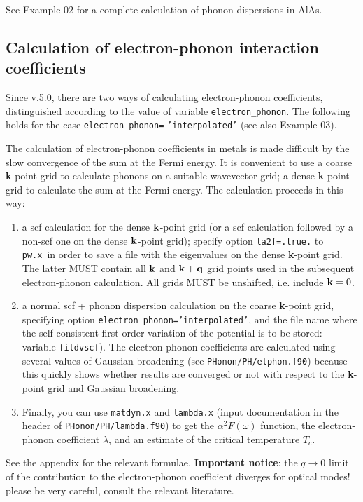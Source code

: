 \documentclass[12pt,a4paper]{article}
\def\pwx{\texttt{pw.x}}
\begin{document}
See Example 02 for a complete calculation of phonon dispersions in AlAs.

\subsection{Calculation of electron-phonon interaction coefficients}

Since v.5.0, there are two ways of calculating electron-phonon
coefficients, distinguished according to the value of variable 
\texttt{electron\_phonon}. The following holds for the case 
\texttt{electron\_phonon=} {\tt'interpolated'} (see also Example 03).

The calculation of electron-phonon coefficients in metals is made difficult 
by the slow convergence of the sum at the Fermi energy. It is convenient to 
use a coarse {\bf k}-point grid to calculate phonons on a suitable 
wavevector grid;
a dense {\bf k}-point grid to calculate the sum at the Fermi energy. 
The calculation
proceeds in this way:
\begin{enumerate}
\item a scf calculation for the dense ${\bf k}$-point grid (or a scf calculation 
followed by a non-scf one on the dense ${\bf k}$-point grid); specify 
option \texttt{la2f=.true.} to \pwx\ in order to save a file with 
the eigenvalues on the dense {\bf k}-point grid. The latter MUST contain 
all ${\bf k}$ and ${\bf k}+{\bf q}$ grid points used in the subsequent 
electron-phonon 
calculation. All grids MUST be unshifted, i.e. include ${\bf k}=0$.
\item a normal scf + phonon dispersion calculation on the coarse {\bf k}-point
grid, specifying option \texttt{electron\_phonon='interpolated'}, and 
the file name where
the self-consistent first-order variation of the potential is to be 
stored: variable \texttt{fildvscf}).
The electron-phonon coefficients are calculated using several
values of Gaussian broadening (see \texttt{PHonon/PH/elphon.f90}) 
because this quickly
shows whether results are converged or not with respect to the 
{\bf k}-point grid and Gaussian broadening.
\item Finally, you can use \texttt{matdyn.x} and \texttt{lambda.x} 
(input documentation in the header of \texttt{PHonon/PH/lambda.f90})
to get the $\alpha^2F(\omega)$ function, the electron-phonon coefficient
$\lambda$, and an estimate of the critical temperature $T_c$.
\end{enumerate}

See the appendix for the relevant formulae.
{\bf Important notice}: the $q\rightarrow 0$ limit of the contribution 
to the electron-phonon coefficient diverges for optical modes! please 
be very careful, consult the relevant literature.
\end{document}
